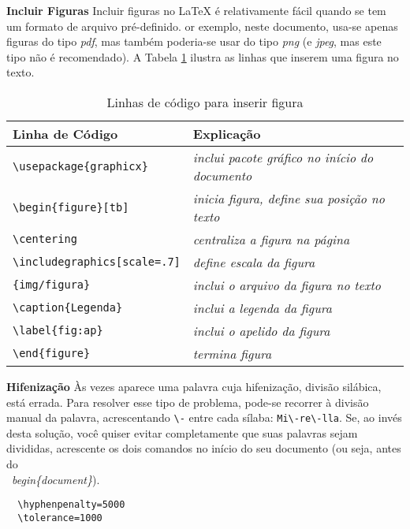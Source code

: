 \begin{anexosenv}
\textbf{Incluir Figuras} Incluir figuras no LaTeX é relativamente fácil quando se tem um formato de arquivo pré-definido.
  or exemplo, neste documento, usa-se apenas figuras do tipo \textit{pdf}, mas também poderia-se usar do tipo \textit{png} (e \textit{jpeg}, mas este tipo não é recomendado).
  A Tabela \ref{tab:codfig} ilustra as linhas que inserem uma figura no texto. 

\begin{table}[ht]
  \caption{Linhas de código para inserir figura}
	\centering
	\footnotesize	
		\begin{tabular}{l l}
	\\	\hline 
Linha de Código & Explicação \\ \hline 
\verb|\usepackage{graphicx}| & \textit{inclui pacote gráfico no início do documento} \\
\verb|\begin{figure}[tb]|    & \textit{inicia figura, define sua posição no texto} \\
\verb|\centering|            & \textit{centraliza a figura na página}\\
\verb|\includegraphics[scale=.7]|& \textit{define escala da figura}\\
\verb|{img/figura}|      & \textit{inclui o arquivo da figura no texto}\\
\verb|\caption{Legenda}|     & \textit{inclui a legenda da figura}\\
\verb|\label{fig:ap}|        & \textit{inclui o apelido da figura}\\
\verb|\end{figure}|          & \textit{termina figura}\\
		\hline\end{tabular}
	\label{tab:codfig}
\end{table}

\textbf{Hifenização} Às vezes aparece uma palavra cuja hifenização, divisão silábica, está errada. Para resolver esse tipo de problema, pode-se recorrer à divisão manual da palavra, acrescentando \verb|\-| entre cada sílaba: \verb|Mi\-re\-lla|. Se, ao invés desta solução, você quiser evitar completamente que suas palavras sejam divididas, acrescente os dois comandos no início do seu documento (ou seja, antes do \\~\textit{begin\{document\}}).

\begin{verbatim}
  \hyphenpenalty=5000
  \tolerance=1000
\end{verbatim}



\end{anexosenv}
